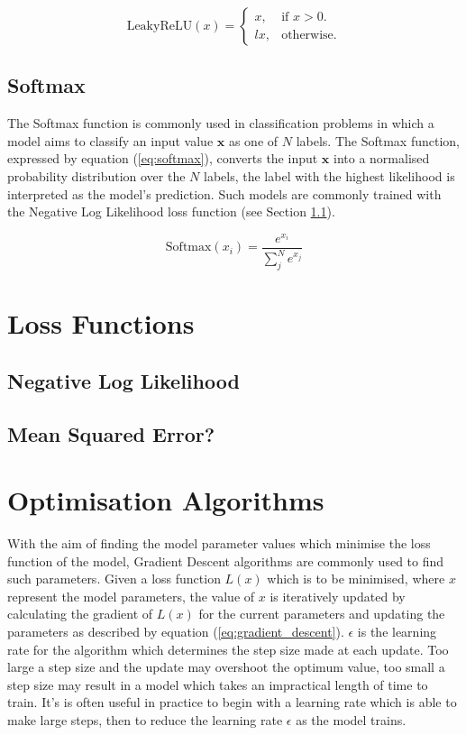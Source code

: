 \begin{equation}\label{eq:lrelu}
    \text{LeakyReLU}(x)=\begin{cases}
      x, & \text{if $x>0$}.\\
      lx, & \text{otherwise}.
    \end{cases}
\end{equation}

\subsection{Softmax}
The Softmax function is commonly used in classification problems in which a model aims to classify an input value $\bm{x}$ as one of $N$ labels.
The Softmax function, expressed by equation (\ref{eq:softmax}), converts the input $\bm{x}$ into a normalised probability distribution over the $N$ labels, the label with the highest likelihood is interpreted as the model's prediction. 
Such models are commonly trained with the Negative Log Likelihood loss function (see Section \ref{nll}).

\begin{equation}\label{eq:softmax}
    \text{Softmax}(x_i) = \frac{e^{x_i}}{\sum_j^N e^{x_j}}
\end{equation}

\section{Loss Functions}
\subsection{Negative Log Likelihood} \label{nll}
\subsection{Mean Squared Error?}

\section{Optimisation Algorithms}
With the aim of finding the model parameter values which minimise the loss function of the model, Gradient Descent algorithms are commonly used to find such parameters.
Given a loss function $L(x)$ which is to be minimised, where $x$ represent the model parameters, the value of $x$ is iteratively updated by calculating the gradient of $L(x)$ for the current parameters and updating the parameters as described by equation (\ref{eq:gradient_descent}).
$\epsilon$ is the learning rate for the algorithm which determines the step size made at each update.
Too large a step size and the update may overshoot the optimum value, too small a step size may result in a model which takes an impractical length of time to train. 
It's is often useful in practice to begin with a learning rate which is able to make large steps, then to reduce the learning rate $\epsilon$ as the model trains.

